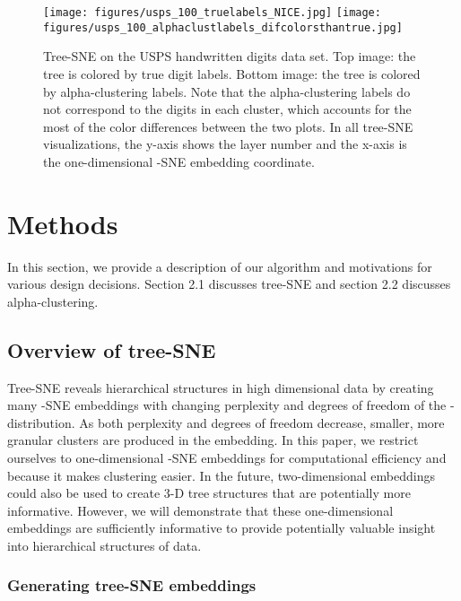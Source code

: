 \documentclass{article}
\begin{document}
\begin{figure}[htp]
    \centering
    \captionsetup{width=.9\linewidth}
    \texttt{[image: figures/usps\_100\_truelabels\_NICE.jpg]}
    \texttt{[image: figures/usps\_100\_alphaclustlabels\_difcolorsthantrue.jpg]}
    \caption{Tree-SNE on the USPS handwritten digits data set. Top image: the tree is colored by true digit labels. Bottom image: the tree is colored by alpha-clustering labels. Note that the alpha-clustering labels do not correspond to the digits in each cluster, which accounts for the most of the color differences between the two plots. In all tree-SNE visualizations, the y-axis shows the layer number and the x-axis is the one-dimensional -SNE embedding coordinate. }
    \label{fig:USPS}
\end{figure}

\section{Methods}
\label{sec:headings}

In this section, we provide a description of our algorithm and motivations for various design decisions. Section 2.1 discusses tree-SNE and section 2.2 discusses alpha-clustering.

\subsection{Overview of tree-SNE}
Tree-SNE reveals hierarchical structures in high dimensional data by creating many -SNE embeddings with changing perplexity and degrees of freedom of the -distribution. As both perplexity and degrees of freedom decrease, smaller, more granular clusters are produced in the embedding. In this paper, we restrict ourselves to one-dimensional -SNE embeddings for computational efficiency and because it makes clustering easier. In the future, two-dimensional embeddings could also be used to create 3-D tree structures that are potentially more informative. However, we will demonstrate that these one-dimensional embeddings are sufficiently informative to provide potentially valuable insight into hierarchical structures of data.

\subsubsection{Generating tree-SNE embeddings} \label{tree-sne-methods}
\end{document}
